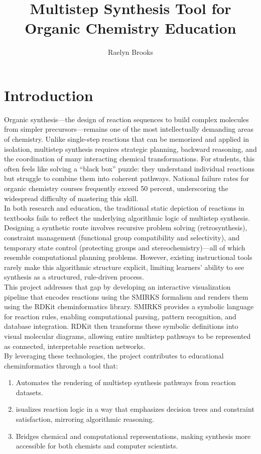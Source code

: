 \documentclass[12pt]{article}
\title{\textbf{Multistep Synthesis Tool for Organic Chemistry Education}}
\author{Raelyn Brooks}
\begin{document}
\maketitle

\section{Introduction}
\indent
Organic synthesis—the design of reaction sequences to build complex molecules from simpler precursors—remains one of the most intellectually demanding areas of chemistry.
Unlike single-step reactions that can be memorized and applied in isolation, multistep synthesis requires strategic planning, backward reasoning, and the coordination of many interacting chemical transformations.
For students, this often feels like solving a “black box” puzzle: they understand individual reactions but struggle to combine them into coherent pathways.
National failure rates for organic chemistry courses frequently exceed 50 percent, underscoring the widespread difficulty of mastering this skill.
\\
\indent
In both research and education, the traditional static depiction of reactions in textbooks fails to reflect the underlying algorithmic logic of multistep synthesis.
Designing a synthetic route involves recursive problem solving (retrosynthesis), constraint management (functional group compatibility and selectivity), and temporary state control (protecting groups and stereochemistry)—all of which resemble computational planning problems.
However, existing instructional tools rarely make this algorithmic structure explicit, limiting learners’ ability to see synthesis as a structured, rule-driven process.
\\
\indent
This project addresses that gap by developing an interactive visualization pipeline that encodes reactions using the SMIRKS formalism and renders them using the RDKit cheminformatics library.
SMIRKS provides a symbolic language for reaction rules, enabling computational parsing, pattern recognition, and database integration.
RDKit then transforms these symbolic definitions into visual molecular diagrams, allowing entire multistep pathways to be represented as connected, interpretable reaction networks.
\\
\indent
By leveraging these technologies, the project contributes to educational cheminformatics through a tool that:
\begin{enumerate}
    \item Automates the rendering of multistep synthesis pathways from reaction datasets.
    \item isualizes reaction logic in a way that emphasizes decision trees and constraint satisfaction, mirroring algorithmic reasoning.
    \item Bridges chemical and computational representations, making synthesis more accessible for both chemists and computer scientists.
\end{enumerate}
\end{document}

